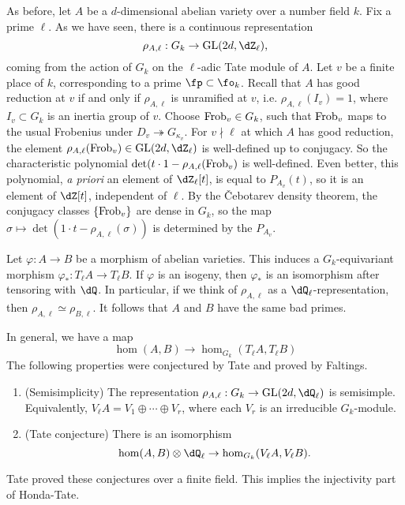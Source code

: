 As before, let $A$ be a $d$-dimensional abelian variety over a number field 
$k$. Fix a prime $\ell$. As we have seen, there is a continuous representation 
\[
  \rho_{A,\ell} : G_k \to \gl{2 d}{\dZ_\ell} \text{,}
\]
coming from the action of $G_k$ on the $\ell$-adic Tate module of $A$. Let $v$ 
be a finite place of $k$, corresponding to a prime $\fp\subset \fo_k$. Recall 
that $A$ has good reduction at $v$ if and only if $\rho_{A,\ell}$ is unramified 
at $v$, i.e. $\rho_{A,\ell}(I_v)=1$, where $I_v\subset G_k$ is an inertia 
group of $v$. Choose $\mathrm{Frob}_v\in G_k$, such that $\mathrm{Frob}_v$ maps to the usual 
Frobenius under $D_v \twoheadrightarrow G_{\kappa_v}$. For $v\nmid \ell$ at 
which $A$ has good reduction, the element 
$\rho_{A,\ell}(\frob_v)\in \gl{2 d}{\dZ_\ell}$ is well-defined up 
to conjugacy. So the characteristic polynomial 
$\det(t\cdot 1-\rho_{A,\ell}(\mathrm{Frob}_v)$ is well-defined. Even better, this 
polynomial, \emph{a priori} an element of $\dZ_\ell[t]$, is equal to 
$P_{A_v}(t)$, so it is an element of $\dZ[t]$, independent of $\ell$. By the 
\v Cebotarev density theorem, the conjugacy classes $\{\mathrm{Frob}_v\}$ are dense 
in $G_k$, so the map 
$\sigma\mapsto \det(1\cdot t-\rho_{A,\ell}(\sigma))$ is determined by the 
$P_{A_v}$. 

Let $\varphi:A\to B$ be a morphism of abelian varieties. This induces a 
$G_k$-equivariant morphism $\varphi_\ast:T_\ell A \to T_\ell B$. If $\varphi$ 
is an isogeny, then $\varphi_\ast$ is an isomorphism after tensoring with 
$\dQ$. In particular, if we think of $\rho_{A,\ell}$ as a 
$\dQ_\ell$-representation, then $\rho_{A,\ell}\simeq \rho_{B,\ell}$. It follows 
that $A$ and $B$ have the same bad primes. 

In general, we have a map 
\[
  \hom(A,B) \to \hom_{G_k}(T_\ell A,T_\ell B)
\]
The following properties were conjectured by Tate and proved by Faltings. 
\begin{enumerate}
  \item (Semisimplicity) The representation 
    $\rho_{A,\ell}:G_k \to \gl{2 d}{\dQ_\ell}$ is semisimple. 
    Equivalently, $V_\ell A = V_1 \oplus \cdots \oplus V_r$, where each 
    $V_r$ is an irreducible $G_k$-module. 
  \item (Tate conjecture) There is an isomorphism 
    \[
      \hom(A,B)\otimes\dQ_\ell \to \hom_{G_k}(V_\ell A,V_\ell B) \text{.}
    \]
\end{enumerate}

Tate proved these conjectures over a finite field. This implies the injectivity 
part of Honda-Tate. 

